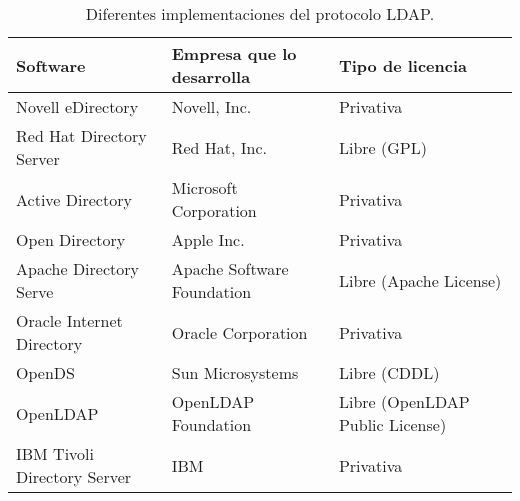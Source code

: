\begin{table}[H]
	\centering
	\begin{tabular}{ |p{4cm}|p{4cm}|p{4cm}| }
		\hline
		\textbf{Software}&\textbf{Empresa que lo desarrolla}&\textbf{Tipo de licencia}\\
		\hline
		Novell eDirectory  &  Novell, Inc.  & Privativa\\
		\hline
		Red Hat Directory Server& Red Hat, Inc.&Libre (GPL)\\
		\hline
		Active Directory &Microsoft Corporation& Privativa\\
		\hline
		Open Directory &Apple Inc.& Privativa\\
		\hline
		Apache Directory Serve&   Apache Software Foundation& Libre (Apache License)\\
		\hline
		Oracle Internet Directory&Oracle Corporation& Privativa\\
		\hline
		OpenDS&Sun Microsystems & Libre (CDDL)\\
		\hline
		OpenLDAP&OpenLDAP Foundation& Libre (OpenLDAP Public License)\\
		\hline
		IBM Tivoli Directory Server&IBM& Privativa\\
		\hline
	\end{tabular}
	\caption{\label{tab:table-name}Diferentes implementaciones del protocolo LDAP.}
\end{table}